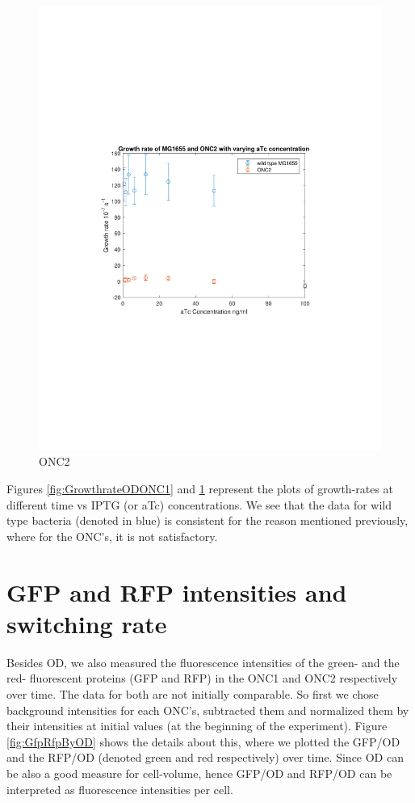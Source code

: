 \documentclass[11pt]{book}
\begin{document}
\begin{figure}
\centering
\includegraphics[scale=0.8]{ONC2growthrate.pdf}
\caption{ONC2}
\label{fig:GrowthrateODONC2}
\end{figure}

Figures \ref{fig:GrowthrateODONC1} and \ref{fig:GrowthrateODONC2} represent the plots of growth-rates at different time vs IPTG (or aTc) concentrations. We see that the data for wild type bacteria (denoted in blue) is consistent for the reason mentioned previously, where for the ONC's, it is not satisfactory. 

\section{GFP and RFP intensities and switching rate}
Besides OD, we also measured the fluorescence intensities of the green- and the red- fluorescent proteins (GFP and RFP) in the ONC1 and ONC2 respectively over time. The data for both are not initially comparable. So first we chose background intensities for each ONC's, subtracted them and normalized them by their intensities at initial values (at the beginning of the experiment). Figure \ref{fig:GfpRfpByOD} shows the details about this, where we plotted the GFP/OD and the RFP/OD (denoted green and red respectively) over time. Since OD can be also a good measure for cell-volume, hence GFP/OD and RFP/OD can be interpreted as fluorescence intensities per cell. 
\end{document}
